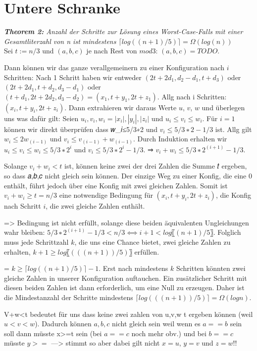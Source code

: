 \chapter{Untere Schranke} 
\textit{\textbf{Theorem 2:} Anzahl der Schritte zur Lösung eines Worst-Case-Falls mit einer Gesamtliterzahl von n ist mindestens $\lceil log ((n+1)/5) \rceil = \Omega (log(n))$} \\

Sei $t:=n/3$ und $(a,b,c)$ je nach Rest von $mod 3$: 
$(a, b, c)= TODO$. 

Dann können wir das ganze verallgemeinern zu einer Konfiguration nach $i$ Schritten: 
Nach 1 Schritt haben wir entweder $(2𝑡+2𝑑_1, 𝑑_2−𝑑_1, 𝑡+𝑑_3)$ oder $(2𝑡+2𝑑_1, 𝑡+𝑑_2, 𝑑_3−𝑑_1)$ oder  $(𝑡+𝑑_1, 2𝑡+2𝑑_2,𝑑_3−𝑑_2 )  = (𝑥_1, 𝑡+𝑦_1, 2𝑡+𝑧_1)$.
Allg nach i Schritten: $(𝑥_𝑖, 𝑡+𝑦_𝑖, 2𝑡+𝑧_𝑖)$.
Dann extrahieren wir daraus Werte $u$, $v$, $w$ und überlegen uns was dafür gilt: 
Seien ${𝑢_𝑖, 𝑣_𝑖, 𝑤_𝑖 }={|𝑥_𝑖 |, |𝑦_𝑖 |, |𝑧_𝑖 |}$ und $𝑢_𝑖≤𝑣_𝑖≤𝑤_𝑖$. 
Für $𝑖=1$ können wir direkt überprüfen dass 𝑤_𝑖≤5/3∗2 und $𝑣_𝑖≤5/3∗2 −1/3$ ist. Allg gilt $𝑤_𝑖≤2𝑤_(𝑖−1)$ und $𝑣_𝑖≤𝑣_(𝑖−1)+𝑤_(𝑖−1)$. 
Durch Induktion erhalten wir $𝑢_𝑖≤𝑣_𝑖≤𝑤_𝑖≤5/3∗2^𝑖$ und $𝑣_𝑖≤5/3∗2^𝑖  −1/3$. 
⇒ $𝑣_𝑖+𝑤_𝑖≤5/3∗2^(𝑖+1)  −1/3$.

Solange $𝑣_𝑖+𝑤_𝑖<𝑡$ ist, können keine zwei der drei Zahlen die Summe 𝑡 ergeben, so dass 𝑎,𝑏,𝑐 nicht gleich sein können. 
Der einzige Weg zu einer Konfig, die eine $0$ enthält, führt jedoch über eine Konfig mit zwei gleichen Zahlen.
Somit ist $𝑣_𝑖+𝑤_𝑖≥𝑡=𝑛/3$ eine notwendige Bedingung für $(𝑥_𝑖, 𝑡+𝑦_𝑖, 2𝑡+𝑧_𝑖)$, die Konfig nach Schritt $i$, die zwei gleiche Zahlen enthält. 

=> Bedingung ist nicht erfüllt, solange diese beiden äquivalenten Ungleichungen wahr bleiben: $5/3∗2^(𝑖+1)  −1/3<𝑛/3  ⟺𝑖+1<log⁡〖(𝑛+1)/5〗$.
Folglich muss jede Schrittzahl $k$, die uns eine Chance bietet, zwei gleiche Zahlen zu erhalten, $𝑘+1≥log⁡〖(((𝑛+1))/5)〗$ erfüllen. 

= $𝑘≥ ⌈log⁡((𝑛+1)/5)  ⌉−1$. Erst nach mindestens $k$ Schritten könnten zwei gleiche Zahlen in unserer Konfiguration auftauchen. 
Ein zusätzlicher Schritt mit diesen beiden Zahlen ist dann erforderlich, um eine Null zu erzeugen. Daher ist die Mindestanzahl der Schritte mindestens $⌈log⁡(((𝑛+1))/5) ⌉= Ω(log⁡𝑛)$. 

V+w<t bedeutet für uns dass keine zwei zahlen von u,v,w t ergeben können (weil $u<v<w$). Dadurch können $a,b,c$ nicht gleich sein weil wenn es $a==b$ sein soll dann müsste x>=t sein (bei $a==c$ noch mehr obv.) und bei $b==c$ müsste $y>=$ 
---> stimmt so aber dabei gilt nicht $x=u$, $y=v$ und $z=w$!!